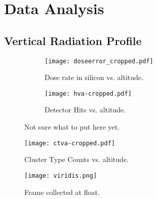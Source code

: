 \section{Data Analysis}
\label{Data Analysis}

\subsection{Vertical Radiation Profile}
\begin{figure}[H]
\centering
\begin{subfigure}{.5\textwidth}
  \centering
  \texttt{[image: doseerror\_cropped.pdf]}
  \caption{Dose rate in silicon vs. altitude.}
  \label{fig:sub1}
\end{subfigure}%
\begin{subfigure}{.5\textwidth}
  \centering
  \texttt{[image: hva-cropped.pdf]}
  \caption{Detector Hits vs. altitude.}
  \label{fig:sub2}
\end{subfigure}
\caption{Not sure what to put here yet.}
\label{fig:test}
\end{figure}

\begin{figure}[H]
\centering
\caption{Cluster Type Counts vs. altitude.}
\texttt{[image: ctva-cropped.pdf]}
\end{figure}

\begin{figure}[H]
\centering
\caption{Frame collected at float.}
\texttt{[image: viridis.png]}
\end{figure}
